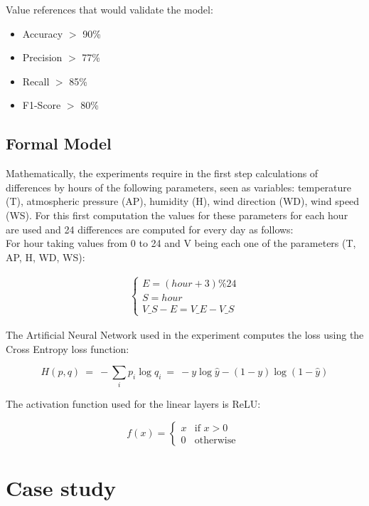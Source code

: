 \documentclass{article}
\begin{document}
Value references that would validate the model:
\begin{itemize}
    \item Accuracy $>$ 90\%
    \item Precision $>$ 77\%
    \item Recall $>$ 85\%
    \item F1-Score $>$ 80\%
\end{itemize}

\subsection{Formal Model}

Mathematically, the experiments require in the first step calculations of differences by hours of the following parameters, seen as variables: temperature (T), atmospheric pressure (AP), humidity (H), wind direction (WD), wind speed (WS). For this first computation the values for these parameters for each hour are used and 24 differences are computed for every day as follows: 
\\

For hour taking values from 0 to 24 and V being each one of the parameters (T, AP, H, WD, WS):

\begin{align}
    \begin{cases}
    E = (hour + 3) \% 24 \\
    S = hour \\
    V\_S-E = V\_E - V\_S 
\end{cases}
\end{align}

The Artificial Neural Network used in the experiment computes the loss using the Cross Entropy loss function:

\begin{equation}
     H(p,q)\ =\ -\sum _{i}p_{i}\log q_{i}\ =\ -y\log {\hat {y}}-(1-y)\log(1-{\hat {y}})
\end{equation}

The activation function used for the linear layers is ReLU:

\begin{equation}
f(x) = \begin{cases}
             x  & \text{if } x > 0 \\
             0  & \text{otherwise }
       \end{cases} 
\end{equation}


\section{Case study}
\end{document}

